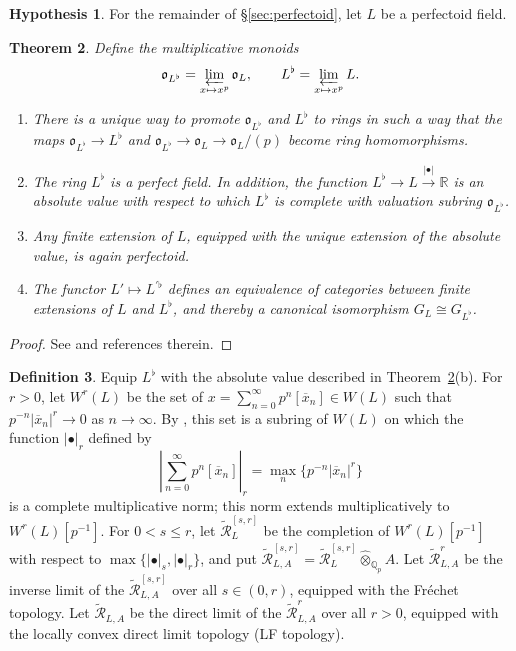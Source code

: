 \documentclass[12pt]{amsart}
\newtheorem{theorem}{Theorem}[section]
\theoremstyle{definition}
\newtheorem{defn}[theorem]{Definition}
\newtheorem{hypothesis}[theorem]{Hypothesis}
\numberwithin{equation}{theorem}
\newcommand{\QQ}{\mathbb{Q}}
\newcommand{\RR}{\mathbb{R}}
\newcommand{\calR}{\mathcal{R}}
\newcommand{\frako}{\mathfrak{o}}
\begin{document}
\begin{hypothesis}
For the remainder of \S\ref{sec:perfectoid}, let $L$ be a perfectoid field.
\end{hypothesis}

\begin{theorem} \label{T:perfectoid}
Define the multiplicative monoids
\[
\frako_{L^{\flat}} = \varprojlim_{x \mapsto x^p} \frako_L, \qquad
L^{\flat} = \varprojlim_{x \mapsto x^p} L.
\]
\begin{enumerate}
\item[(a)]
There is a unique way to promote $\frako_{L^{\flat}}$ and $L^{\flat}$ to rings
in such a way that the maps $\frako_{L^{\flat}} \to L^{\flat}$ and $\frako_{L^{\flat}} \to \frako_L \to \frako_L/(p)$ become ring homomorphisms.
\item[(b)]
The ring $L^{\flat}$ is a perfect field. In addition,
the function $L^{\flat} \to L \stackrel{\left| \bullet \right|}{\to} \RR$ is an absolute value with respect to which $L^{\flat}$ is complete with valuation subring $\frako_{L^{\flat}}$.
\item[(c)]
Any finite extension of $L$, equipped with the unique extension of the absolute value, is again perfectoid.
\item[(d)]
The functor $L' \mapsto L^{\prime \flat}$ defines an equivalence of categories between finite extensions of $L$ and $L^{\flat}$, and thereby a canonical isomorphism $G_L \cong G_{L^{\flat}}$.
\end{enumerate}
\end{theorem}
\begin{proof}
See \cite[\S 1]{kedlaya-new-phigamma} and references therein.
\end{proof}

\begin{defn}
Equip $L^\flat$ with the absolute value described in 
Theorem~\ref{T:perfectoid}(b). 
For $r>0$, let $W^r(L)$ be the set of $x = \sum_{n=0}^\infty p^n [\overline{x}_n] \in W(L)$ such that $p^{-n} \left| \overline{x}_n \right|^r \to 0$ as $n \to \infty$.
By \cite[Proposition~5.1.2]{kedlaya-liu1}, this set is a subring of $W(L)$ on which 
the function $\left| \bullet \right|_r$ defined by
\[
\left| \sum_{n=0}^\infty p^n [\overline{x}_n]  \right|_r = \max_n \{p^{-n} \left| \overline{x}_n \right|^r\}
\]
is a complete multiplicative norm; this norm extends multiplicatively to $W^r(L)[p^{-1}]$.
For $0 < s \leq r$, let $\tilde{\calR}^{[s,r]}_L$ be the completion of $W^r(L)[p^{-1}]$
with respect to $\max\{\left| \bullet \right|_s, \left| \bullet \right|_r\}$,
and put $\tilde{\calR}^{[s,r]}_{L,A} = \tilde{\calR}^{[s,r]}_L \widehat{\otimes}_{\QQ_p} A$.
Let $\tilde{\calR}^r_{L,A}$ be the inverse limit of the $\tilde{\calR}^{[s,r]}_{L,A}$ over all $s \in (0,r)$, equipped with the Fr\'echet topology. Let $\tilde{\calR}_{L,A}$ be the direct  limit of the $\tilde{\calR}^r_{L,A}$ over all $r>0$, equipped with the locally convex direct limit topology (LF topology).
\end{defn}
\end{document}
